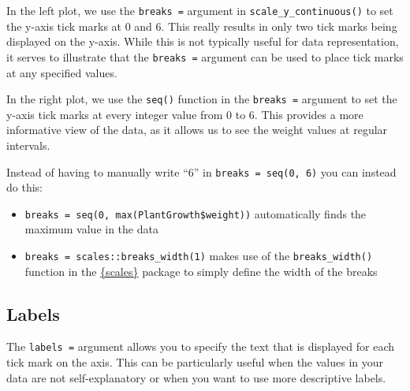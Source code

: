 \documentclass[
  letterpaper,
  DIV=11,
  numbers=noendperiod]{scrartcl}
\providecommand{\tightlist}{%
  \setlength{\itemsep}{0pt}\setlength{\parskip}{0pt}}\usepackage{longtable,booktabs,array}
\begin{document}
In the left plot, we use the \texttt{breaks\ =} argument in
\texttt{scale\_y\_continuous()} to set the y-axis tick marks at 0 and 6.
This really results in only two tick marks being displayed on the
y-axis. While this is not typically useful for data representation, it
serves to illustrate that the \texttt{breaks\ =} argument can be used to
place tick marks at any specified values.

In the right plot, we use the \texttt{seq()} function in the
\texttt{breaks\ =} argument to set the y-axis tick marks at every
integer value from 0 to 6. This provides a more informative view of the
data, as it allows us to see the weight values at regular intervals.

\begin{tcolorbox}[enhanced jigsaw, left=2mm, title=\textcolor{quarto-callout-tip-color}{\faLightbulb}\hspace{0.5em}{Tip}, toprule=.15mm, colback=white, coltitle=black, opacityback=0, breakable, titlerule=0mm, bottomtitle=1mm, toptitle=1mm, colbacktitle=quarto-callout-tip-color!10!white, arc=.35mm, rightrule=.15mm, bottomrule=.15mm, leftrule=.75mm, colframe=quarto-callout-tip-color-frame, opacitybacktitle=0.6]

Instead of having to manually write ``6'' in
\texttt{breaks\ =\ seq(0,\ 6)} you can instead do this:

\begin{itemize}
\tightlist
\item
  \texttt{breaks\ =\ seq(0,\ max(PlantGrowth\$weight))} automatically
  finds the maximum value in the data
\item
  \texttt{breaks\ =\ scales::breaks\_width(1)} makes use of the
  \texttt{breaks\_width()} function in the
  \href{https://scales.r-lib.org/index.html}{\{scales\}} package to
  simply define the width of the breaks
\end{itemize}

\end{tcolorbox}

\hypertarget{labels}{%
\subsection{Labels}\label{labels}}

The \texttt{labels\ =} argument allows you to specify the text that is
displayed for each tick mark on the axis. This can be particularly
useful when the values in your data are not self-explanatory or when you
want to use more descriptive labels.
\end{document}
